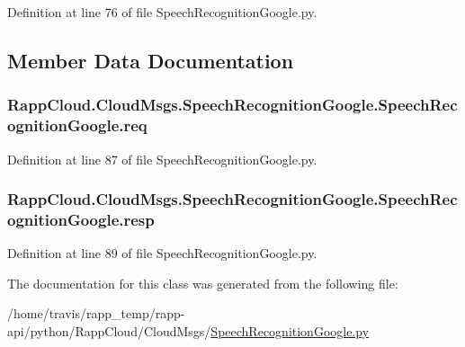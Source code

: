Definition at line 76 of file Speech\-Recognition\-Google.\-py.



\subsection{Member Data Documentation}
\hypertarget{classRappCloud_1_1CloudMsgs_1_1SpeechRecognitionGoogle_1_1SpeechRecognitionGoogle_a985fd527982facb0c4d6d2cc94206779}{
\subsubsection[{req}]{\setlength{\rightskip}{0pt plus 5cm}Rapp\-Cloud.\-Cloud\-Msgs.\-Speech\-Recognition\-Google.\-Speech\-Recognition\-Google.\-req}}\label{classRappCloud_1_1CloudMsgs_1_1SpeechRecognitionGoogle_1_1SpeechRecognitionGoogle_a985fd527982facb0c4d6d2cc94206779}


Definition at line 87 of file Speech\-Recognition\-Google.\-py.

\hypertarget{classRappCloud_1_1CloudMsgs_1_1SpeechRecognitionGoogle_1_1SpeechRecognitionGoogle_a4b4839e3499956bd0062b1cb19317700}{
\subsubsection[{resp}]{\setlength{\rightskip}{0pt plus 5cm}Rapp\-Cloud.\-Cloud\-Msgs.\-Speech\-Recognition\-Google.\-Speech\-Recognition\-Google.\-resp}}\label{classRappCloud_1_1CloudMsgs_1_1SpeechRecognitionGoogle_1_1SpeechRecognitionGoogle_a4b4839e3499956bd0062b1cb19317700}


Definition at line 89 of file Speech\-Recognition\-Google.\-py.



The documentation for this class was generated from the following file\-:\begin{DoxyCompactItemize}
\item 
/home/travis/rapp\-\_\-temp/rapp-\/api/python/\-Rapp\-Cloud/\-Cloud\-Msgs/\hyperlink{SpeechRecognitionGoogle_8py}{Speech\-Recognition\-Google.\-py}\end{DoxyCompactItemize}
